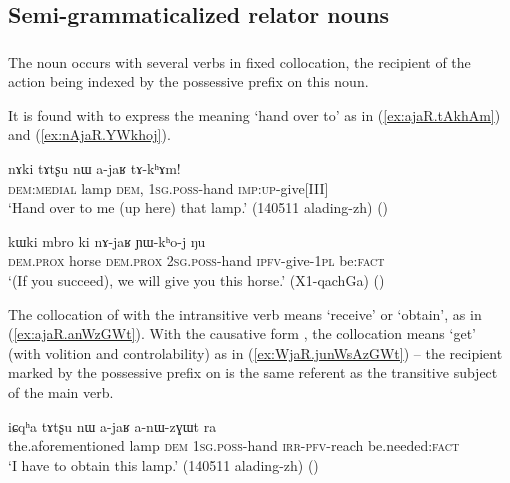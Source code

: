 \subsection{Semi-grammaticalized relator nouns} \label{sec:semi.grammaticalized.relator}

\subsubsection{} \label{sec:tWjaR}
The noun  occurs with several verbs in fixed collocation, the recipient of the action being indexed by the possessive prefix on this noun.

It is found with  to express the meaning `hand over to' as in (\ref{ex:ajaR.tAkhAm}) and (\ref{ex:nAjaR.YWkhoj}).

\begin{exe}
\ex \label{ex:ajaR.tAkhAm}
\gll nɤki tɤtʂu nɯ a-jaʁ tɤ-kʰɤm! \\
\textsc{dem}:\textsc{medial} lamp \textsc{dem}, \textsc{1sg}.\textsc{poss}-hand \textsc{imp}:\textsc{up}-give[III] \\
\glt `Hand over to me (up here) that lamp.' (140511 alading-zh)
()
\end{exe}

\begin{exe}
\ex \label{ex:nAjaR.YWkhoj}
\gll kɯki mbro ki nɤ-jaʁ ɲɯ-kʰo-j ŋu \\
\textsc{dem}.\textsc{prox} horse \textsc{dem}.\textsc{prox} \textsc{2sg}.\textsc{poss}-hand \textsc{ipfv}-give-\textsc{1pl} be:\textsc{fact} \\
\glt  `(If you succeed), we will give you this horse.'  (X1-qachGa)
()
\end{exe}

The collocation of  with the intransitive verb  means `receive' or `obtain', as in (\ref{ex:ajaR.anWzGWt}). With the causative form , the collocation means `get' (with volition and controlability) as in (\ref{ex:WjaR.junWsAzGWt}) -- the recipient marked by the possessive prefix on   is the same referent as the transitive subject of the main verb.

\begin{exe}
\ex \label{ex:ajaR.anWzGWt}
\gll iɕqʰa tɤtʂu nɯ a-jaʁ a-nɯ-zɣɯt ra \\
the.aforementioned lamp \textsc{dem} \textsc{1sg}.\textsc{poss}-hand \textsc{irr}-\textsc{pfv}-reach be.needed:\textsc{fact} \\
\glt   `I have to obtain this lamp.' (140511 alading-zh)
()
\end{exe}

